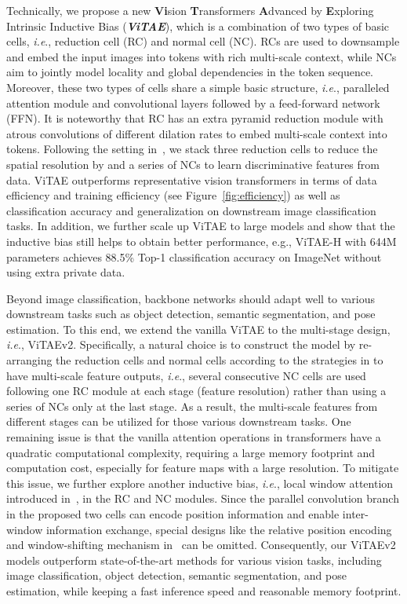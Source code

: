 \documentclass[twocolumn]{svjour3}          \smartqed  \usepackage{natbib}
\newcommand{\ie}{i.e}
\def\onedot{.\xspace}
\def\ie{\emph{i.e}\onedot}
\begin{document}
Technically, we propose a new \textbf{Vi}sion \textbf{T}ransformers \textbf{A}dvanced by \textbf{E}xploring Intrinsic Inductive Bias (\textit{\textbf{ViTAE}}), which is a combination of two types of basic cells, \ie, reduction cell (RC) and normal cell (NC). RCs are used to downsample and embed the input images into tokens with rich multi-scale context, while NCs aim to jointly model locality and global dependencies in the token sequence. Moreover, these two types of cells share a simple basic structure, \ie, paralleled attention module and convolutional layers followed by a feed-forward network (FFN). It is noteworthy that RC has an extra pyramid reduction module with atrous convolutions of different dilation rates to embed multi-scale context into tokens. Following the setting in~\citep{yuan2021tokens}, we stack three reduction cells to reduce the spatial resolution by  and a series of NCs to learn discriminative features from data. ViTAE outperforms representative vision transformers in terms of data efficiency and training efficiency (see Figure~\ref{fig:efficiency}) as well as classification accuracy and generalization on downstream image classification tasks. In addition, we further scale up ViTAE to large models and show that the inductive bias still helps to obtain better performance, e.g., ViTAE-H with 644M parameters achieves 88.5\% Top-1 classification accuracy on ImageNet without using extra private data.

Beyond image classification, backbone networks should adapt well to various downstream tasks such as object detection, semantic segmentation, and pose estimation. To this end, we extend the vanilla ViTAE to the multi-stage design, \ie, ViTAEv2. Specifically, a natural choice is to construct the model by re-arranging the reduction cells and normal cells according to the strategies in \citep{wang2021pyramid,liu2021swin} to have multi-scale feature outputs, \ie, several consecutive NC cells are used following one RC module at each stage (feature resolution) rather than using a series of NCs only at the last stage. As a result, the multi-scale features from different stages can be utilized for those various downstream tasks. One remaining issue is that the vanilla attention operations in transformers have a quadratic computational complexity, requiring a large memory footprint and computation cost, especially for feature maps with a large resolution. To mitigate this issue, we further explore another inductive bias, \ie, local window attention introduced in~\citep{liu2021swin}, in the RC and NC modules. Since the parallel convolution branch in the proposed two cells can encode position information and enable inter-window information exchange, special designs like the relative position encoding and window-shifting mechanism in~\citep{liu2021swin} can be omitted. Consequently, our ViTAEv2 models outperform state-of-the-art methods for various vision tasks, including image classification, object detection, semantic segmentation, and pose estimation, while keeping a fast inference speed and reasonable memory footprint.
\end{document}
